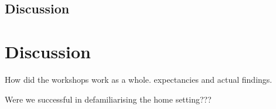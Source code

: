 \subsection{Discussion}
\label{ch:workshops:workshop-ii:discussion}

\section{Discussion}
\label{ch:workshops:discussion}

How did the workshops work as a whole. expectancies and actual findings.

 Were we successful in defamiliarising the home setting???

